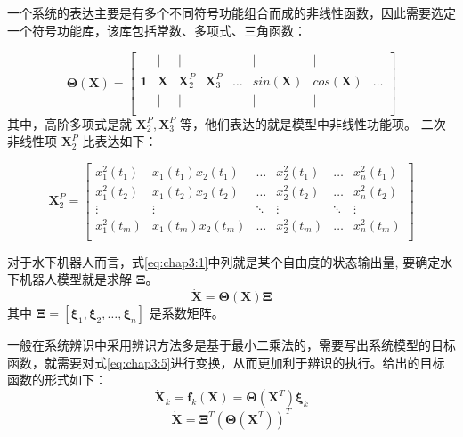 一个系统的表达主要是有多个不同符号功能组合而成的非线性函数，因此需要选定一个符号功能库，该库包括常数、多项式、三角函数：


\begin{equation}
\label{eq:chap3:3}
\bm{\Theta(\bm{X})}= \begin{bmatrix}
|      & |      &  |         &|           &        &|            &|          &         \\
\bm{1} & \bm{X} & \bm{X}^P_2 & \bm{X}^P_3 & \ldots & sin(\bm{X}) &cos(\bm{X}) & \ldots \\
|      & |      &  |         &|           &        &|            &|          &         \\
\end{bmatrix}
\end{equation}
其中，高阶多项式是就 $\bm{X}^P_2, \bm{X}^P_3$ 等，他们表达的就是模型中非线性功能项。 二次非线性项 $\bm{X}^P_2$ 比表达如下：

\begin{equation}
\label{eq:chap3:4}
\bm{X}^P_2 = \begin{bmatrix}
x_1^2(t_1) &  x_1(t_1)x_2(t_1)   & \ldots & x_2^2(t_1) & \ldots &  x_n^2(t_1) \\
x_1^2(t_2) &  x_1(t_2)x_2(t_2)   & \ldots & x_2^2(t_2) & \ldots &  x_n^2(t_2) \\
\vdots     & \vdots              & \ddots & \vdots     & \ddots & \vdots      \\
x_1^2(t_m) &  x_1(t_m)x_2(t_m)   & \ldots & x_2^2(t_m) & \ldots &  x_n^2(t_m) \\
\end{bmatrix}
\end{equation}

对于水下机器人而言，式\ref{eq:chap3:1}中列就是某个自由度的状态输出量, 要确定水下机器人模型就是求解 $\bm{\Xi}$。
\begin{equation}
\label{eq:chap3:5}
\dot{\bm{X}} =
\bm{\Theta}(\bm{X}) \bm{\Xi}
\end{equation}
其中 $\bm{\Xi} = [\bm{\xi}_1, \bm{\xi}_2,\ldots,\bm{\xi}_n]$ 是系数矩阵。

一般在系统辨识中采用辨识方法多是基于最小二乘法的\cite{friedman2001elements}，需要写出系统模型的目标函数，就需要对式\ref{eq:chap3:5}进行变换，从而更加利于辨识的执行。给出的目标函数的形式如下\cite{brunton2016discovering,wu2016parametric}：
\begin{equation}
\label{eq:chap3:6}
\dot{\bm{X}}_k = \bm{f}_k(\bm{X}) = \bm{\Theta}(\bm{X}^T)\bm{\xi}_k
\end{equation}
\begin{equation}
\label{eq:chap3:7}
\dot{\bm{X}}= {\bm{\Xi} }^T (\bm{\Theta}(\bm{X}^T))^T
\end{equation}

